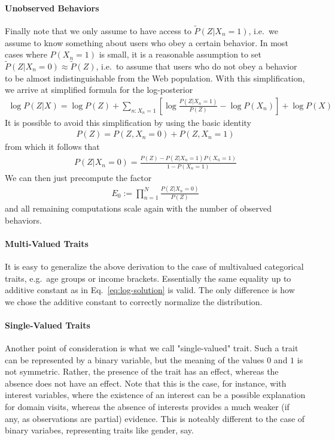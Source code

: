 \documentclass{article}
\begin{document}
\paragraph{Unobserved Behaviors}

Finally note that we only assume to have access to $\tilde P(Z|X_n=1)$, i.e.~we assume to know something about users who obey a certain behavior. In most cases where $P(X_n=1)$ is small, it is a reasonable assumption to set $\tilde P(Z|X_n=0) \approx \tilde P(Z)$, i.e.~to assume that users who do not obey a behavior to be almost indistinguishable from the Web population. With this simplification, we arrive at simplified formula for the log-posterior
\begin{align}
\log P(Z|X) = \log P(Z) + \sum_{n: X_n=1} \left[ \log \frac{P(Z|X_n=1)}{P(Z)} - \log P(X_n) \right]
+ \log P(X)
\label{eq:log-solution}
\end{align}
%
It is possible to avoid this simplification by using the basic identity 
\begin{align}
P(Z) = P(Z, X_{n}=0) + P(Z, X_n=1)
\end{align}
from which it follows that
\begin{align}
P(Z | X_n=0) = \frac{P(Z) - P(Z| X_n=1) P(X_n=1)}{1-P(X_n=1)}
\end{align}
We can then just precompute the factor 
\begin{align}
E_0 := \prod_{n=1}^N \frac{P(Z | X_n=0)}{P(Z)}
\end{align}
and all remaining computations scale again with the number of observed behaviors. 

\paragraph{Multi-Valued Traits}

It is easy to generalize the above derivation to the case of multivalued categorical traits, e.g.~age groups or income brackets. Essentially the same equality up to additive constant as in Eq.~\eqref{eq:log-solution} is valid. The only difference is how we chose the additive constant to correctly normalize the distribution. 

\paragraph{Single-Valued Traits}

Another point of consideration is what we call "single-valued" trait. Such a trait can be represented by a binary variable, but the meaning of the values $0$ and $1$ is not symmetric. Rather, the presence of the trait has an effect, whereas the absence does not have an effect. Note that this is the case, for instance, with interest variables, where the existence of an interest can be a possible explanation for domain visits, whereas the absence of interests provides a much weaker (if any, as observations are partial) evidence. This is noteably different to the case of binary variabes, representing traits like gender, say. 
\end{document}
